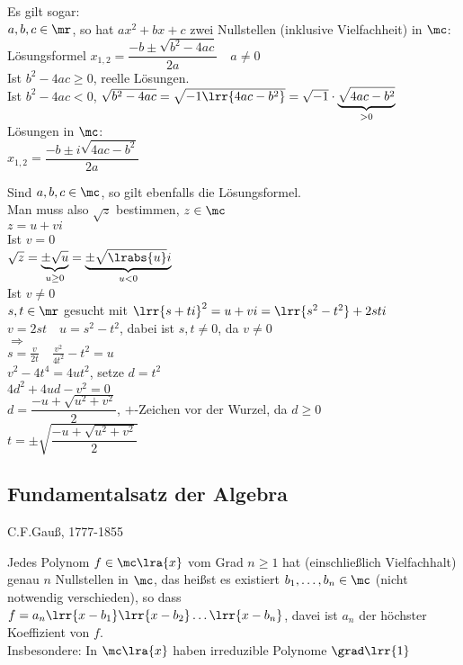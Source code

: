 			Es gilt sogar:\\
			$a,b,c\in\mr$, so hat $ax^2+bx+c$ zwei Nullstellen (inklusive Vielfachheit) in $\mc$:\\
			Lösungsformel $x_{1,2}=\dfrac{-b\pm\sqrt{b^2-4ac}}{2a}\quad a\neq 0$\\
			Ist $b^2-4ac\geq 0$, reelle Lösungen.\\
			Ist $b^2-4ac <0$, $\sqrt{b^2-4ac}=\sqrt{-1\lrr{4ac-b^2}}=\sqrt{-1}\cdot \underbrace{\sqrt{4ac-b^2}}_{>0}$\\
			Lösungen in $\mc$:\\
			$x_{1,2} =\dfrac{-b\pm i\sqrt{4ac-b^2}}{2a}$
		\item Sind $a,b,c \in \mc$, so gilt ebenfalls die Lösungsformel.\\
			Man muss also $\sqrt{z}$ bestimmen, $z\in\mc$\\
			$z=u+vi$\\
			Ist $v=0$\\
			$\sqrt{z}=\underbrace{\pm\sqrt{u}}_{u\geq 0}=\underbrace{\pm\sqrt{\lrabs{u}}i}_{u<0}$\\
			Ist $v\neq 0$\\
			$s,t\in\mr$ gesucht mit $\lrr{s+ti}^2=u+vi=\lrr{s^2-t^2}+2sti$\\
			$v=2st\quad u=s^2-t^2$, dabei ist $s,t\neq 0$, da $v\neq 0$\\
			$\Rightarrow$\\
			$s=\frac{v}{2t}\quad\frac{v^2}{4t^2}-t^2=u$\\
			$v^2-4t^4=4ut^2$, setze $d=t^2$\\
			$4d^2+4ud-v^2=0$\\
			$d=\dfrac{-u+\sqrt{u^2+v^2}}{2}$, $+$-Zeichen vor der Wurzel, da $d\geq 0$\\
			$t=\pm\sqrt{\dfrac{-u+\sqrt{u^2+v^2}}{2}}$
	\subExEnd

\subsection{Fundamentalsatz der Algebra}
	C.F.Gauß, 1777-1855
	
	Jedes Polynom $f\in\mc\lra{x}$ vom Grad $n\geq 1$ hat (einschließlich Vielfachhalt) genau $n$ Nullstellen in $\mc$, das heißst es existiert $b_1,\dots,b_n\in\mc$ (nicht notwendig verschieden), so dass $f=a_n\lrr{x-b_1}\lrr{x-b_2}\dots\lrr{x-b_n}$, davei ist $a_n$ der höchster Koeffizient von $f$. \\
	Insbesondere: In $\mc\lra{x}$ haben irreduzible Polynome $\grad\lrr{1}$

